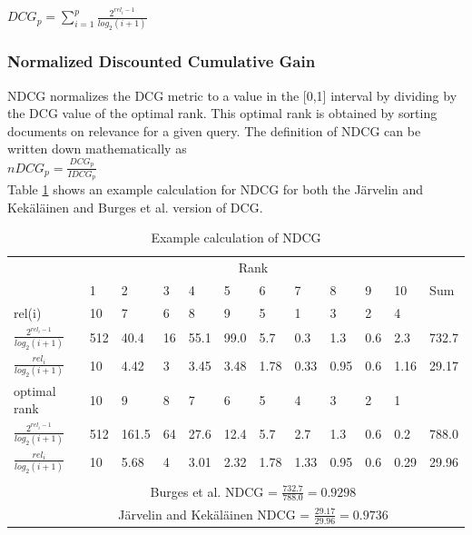 $DCG_p = \sum\nolimits_{i=1}^p \frac{2^{rel_i-1}}{log_2(i+1)}$\\

\subsubsection{Normalized Discounted Cumulative Gain}
\ac{NDCG} normalizes the \ac{DCG} metric to a value in the [0,1] interval by dividing by the \ac{DCG} value of the optimal rank. This optimal rank is obtained by sorting documents on relevance for a given query. The definition of \ac{NDCG} can be written down mathematically as\\

$nDCG_p = \frac{DCG_p}{IDCG_p}$\\

Table \ref{tab:example_calculation_NDCG} shows an example calculation for \ac{NDCG} for both the J{\"a}rvelin and Kek{\"a}l{\"a}inen \cite{Jarvelin2002} and Burges et al. \cite{Burges2005} version of \ac{DCG}.\\

\begin{table}[!h]
\begin{tabular}{llllllllllll}
 & \multicolumn{10}{c}{Rank} &  \\ 
\cline{2-11}
 & 1 & 2 & 3 & 4 & 5 & 6 & 7 & 8 & 9 & 10 & Sum \\ 
\hline
\hline
rel(i) & 10 & 7 & 6 & 8 & 9 & 5 & 1 & 3 & 2 & 4 &  \\
\hline
$\frac{2^{rel_i-1}}{log_2(i+1)}$ & 512 & 40.4 & 16 & 55.1 & 99.0 & 5.7 & 0.3 & 1.3 & 0.6 & 2.3 & 732.7 \\
\hline
$\frac{rel_i}{log_2(i+1)}$ & 10 & 4.42 & 3 & 3.45 & 3.48 & 1.78 & 0.33 & 0.95 & 0.6 & 1.16 & 29.17 \\  
\hline
\hline
optimal rank & 10 & 9 & 8 & 7 & 6 & 5 & 4 & 3 & 2 & 1 &  \\
\hline 
$\frac{2^{rel_i-1}}{log_2(i+1)}$ & 512 & 161.5 & 64 & 27.6 & 12.4 & 5.7 & 2.7 & 1.3 & 0.6 & 0.2 & 788.0 \\
\hline
$\frac{rel_i}{log_2(i+1)}$ & 10 & 5.68 & 4 & 3.01 & 2.32 & 1.78 & 1.33 & 0.95 & 0.6 & 0.29 & 29.96 \\   
\hline
 &  &  &  &  &  &  &  &  &  &  &  \\
 & \multicolumn{10}{c}{Burges \cite{Burges2005} et al. \ac{NDCG} = $\frac{732.7}{788.0} = 0.9298$} &  \\ 
  & \multicolumn{10}{c}{J{\"a}rvelin and Kek{\"a}l{\"a}inen \cite{Jarvelin2002} \ac{NDCG} = $\frac{29.17}{29.96} = 0.9736$} &  \\
\end{tabular}
\caption{Example calculation of \acs{NDCG}}
\label{tab:example_calculation_NDCG}
\end{table}

